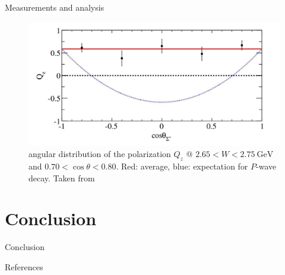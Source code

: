 \documentclass[11pt,aspectratio=1610,dvipsnames]{beamer}
\begin{document}
\begin{frame}{Measurements and analysis}
	\begin{figure}
		\centering
		\includegraphics[width=\linewidth]{angular_pol}
		\caption{angular distribution of the polarization $Q_z$ @ $2.65<W<\SI{2.75}{\giga\eV}$ and $0.70<\cos\theta<0.80$. Red: average, blue: expectation for $P$-wave decay. Taken from \citet{spinparity}}
	\end{figure}
	
\end{frame}




\section{Conclusion}
\begin{frame}{Conclusion}
	
\end{frame}





\begin{frame}{References}
	\printbibliography
\end{frame}
\end{document}
